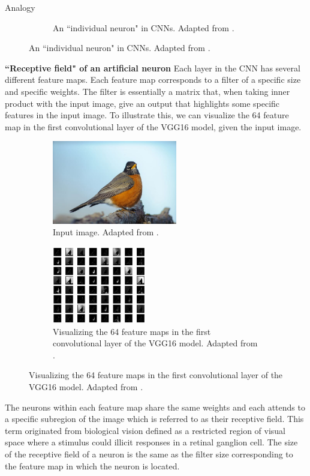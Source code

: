 \documentclass[xcolor={dvipsnames,svgnames}]{beamer}
\begin{document}
\begin{frame}[allowframebreaks]{Analogy}
\begin{figure}[H]
\begin{subfigure}[b]{0.45\textwidth}
        \caption{An ``individual neuron" in CNNs. Adapted from \cite{cs231n}.}
\end{subfigure}
\end{figure}
\textbf{``Receptive field" of an artificial neuron}
Each layer in the CNN has several different feature maps. Each feature map corresponds to a filter of a specific size and specific weights. The filter is essentially a matrix that, when taking inner product with the input image, give an output that highlights some specific features in the input image. To illustrate this, we can visualize the 64 feature map in the first convolutional layer of the VGG16 model, given the input image.
\begin{figure}[H]
\centering
\begin{subfigure}[b]{0.3\textwidth}
        \centering
  \includegraphics[width=0.6\textwidth]{figures/artificial/bird.jpg}
\caption{Input image. Adapted from \cite{feature_map}.}
\end{subfigure}
\hfill
\begin{subfigure}[b]{0.65\textwidth}
\centering
    \includegraphics[width=0.45\textwidth]{figures/artificial/feature_map_vgg16.png}
    \caption{Visualizing the 64 feature maps in the first convolutional layer of the VGG16 model. Adapted from \cite{feature_map}.}
\end{subfigure}
\end{figure} 

The neurons within each feature map share the same weights and each attends to a specific subregion of the image which is referred to as their receptive field. This term originated from biological vision defined as a restricted region of visual space where a stimulus could illicit responses in a retinal ganglion cell. The size of the receptive field of a neuron is the same as the filter size corresponding to the feature map in which the neuron is located. 


\end{frame}
\end{document}
